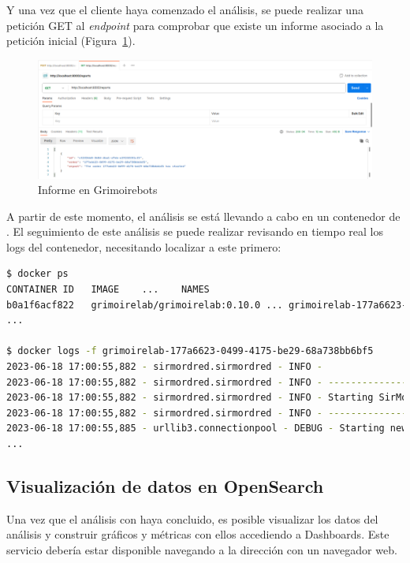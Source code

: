 Y una vez que el cliente haya comenzado el análisis, se puede realizar una petición GET al \emph{endpoint}  para comprobar que existe un informe asociado a la petición inicial (Figura~\ref{fig:example6}).

\begin{figure}[ht]
    \centering
    \includegraphics[width=\textwidth]{Figures/example6}
    \decoRule
    \caption[Grimoirebots (Informe)]{Informe en Grimoirebots}
    \label{fig:example6}
\end{figure}

A partir de este momento, el análisis se está llevando a cabo en un contenedor de . El seguimiento de este análisis se puede realizar revisando en tiempo real los logs del contenedor, necesitando localizar a este primero:

\begin{lstlisting}[language=bash]
$ docker ps
CONTAINER ID   IMAGE    ...    NAMES
b0a1f6acf822   grimoirelab/grimoirelab:0.10.0 ... grimoirelab-177a6623-0499-4175-be29-68a738bb6bf5
...

$ docker logs -f grimoirelab-177a6623-0499-4175-be29-68a738bb6bf5
2023-06-18 17:00:55,882 - sirmordred.sirmordred - INFO -
2023-06-18 17:00:55,882 - sirmordred.sirmordred - INFO - ----------------------------
2023-06-18 17:00:55,882 - sirmordred.sirmordred - INFO - Starting SirMordred engine ...
2023-06-18 17:00:55,882 - sirmordred.sirmordred - INFO - ----------------------------
2023-06-18 17:00:55,885 - urllib3.connectionpool - DEBUG - Starting new HTTPS connection (1): localhost:9200
...
\end{lstlisting}

\subsection{Visualización de datos en OpenSearch}

Una vez que el análisis con  haya concluido, es posible visualizar los datos del análisis y construir gráficos y métricas con ellos accediendo a  Dashboards. Este servicio debería estar disponible navegando a la dirección  con un navegador web.

